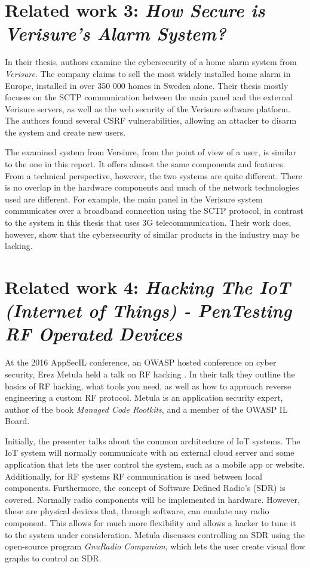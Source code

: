 \section{Related work 3: \textit{How Secure is Verisure’s Alarm System?}}
In their thesis, authors \citeauthor{verisurethesis} examine the cybersecurity of a home alarm system from \textit{Verisure}. The company claims to sell the most widely installed home alarm in Europe, installed in over 350 000 homes in Sweden alone. Their thesis mostly focuses on the SCTP communication between the main panel and the external Verisure servers, as well as the web security of the Verisure software platform. The authors found several \gls{CSRF} vulnerabilities, allowing an attacker to disarm the system and create new users.

The examined system from Versiure, from the point of view of a user, is similar to the one in this report. It offers almost the same components and features. From a technical perspective, however, the two systems are quite different. There is no overlap in the hardware components and much of the network technologies used are different. For example, the main panel in the Verisure system communicates over a broadband connection using the SCTP protocol, in contrast to the system in this thesis that uses 3G telecommunication. Their work does, however, show that the cybersecurity of similar products in the industry may be lacking.

\section{Related work 4: \textit{Hacking The IoT (Internet of Things) - PenTesting RF Operated Devices}}
At the 2016 AppSecIL conference, an OWASP hosted conference on cyber security, Erez Metula held a talk on RF hacking \cite{hacking-the-iot-talk}. In their talk they outline the basics of RF hacking, what tools you need, as well as how to approach reverse engineering a custom RF protocol. Metula is an application security expert, author of the book \textit{Managed Code Rootkits}, and a member of the OWASP IL Board.

Initially, the presenter talks about the common architecture of IoT systems. The IoT system will normally communicate with an external cloud server and some application that lets the user control the system, such as a mobile app or website. Additionally, for RF systems RF communication is used between local components. Furthermore, the concept of Software Defined Radio's (\gls{SDR}) is covered. Normally radio components will be implemented in hardware. However, these are physical devices that, through software, can emulate any radio component. This allows for much more flexibility and allows a hacker to tune it to the system under consideration. Metula discusses controlling an SDR using the open-source program \textit{GnuRadio Companion}, which lets the user create visual flow graphs to control an SDR.

